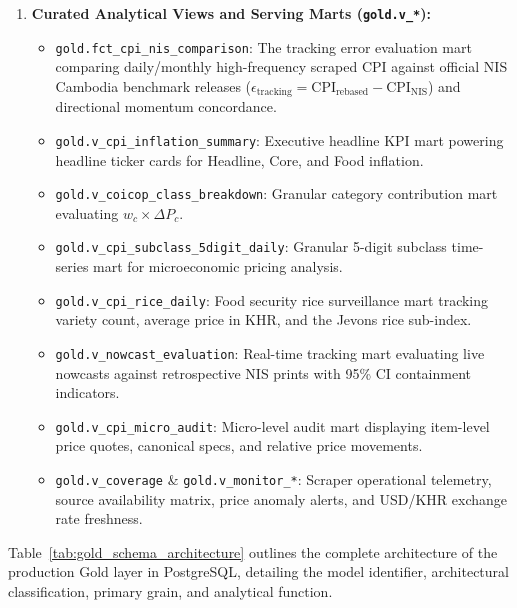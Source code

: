 \begin{enumerate}
    \item \textbf{Curated Analytical Views and Serving Marts (\texttt{gold.v\_*}):}
    \begin{itemize}
        \item \texttt{gold.fct\_cpi\_nis\_comparison}: The tracking error evaluation mart comparing daily/monthly high-frequency scraped CPI against official NIS Cambodia benchmark releases ($\epsilon_{\text{tracking}} = \text{CPI}_{\text{rebased}} - \text{CPI}_{\text{NIS}}$) and directional momentum concordance.
        \item \texttt{gold.v\_cpi\_inflation\_summary}: Executive headline KPI mart powering headline ticker cards for Headline, Core, and Food inflation.
        \item \texttt{gold.v\_coicop\_class\_breakdown}: Granular category contribution mart evaluating $w_c \times \Delta P_c$.
        \item \texttt{gold.v\_cpi\_subclass\_5digit\_daily}: Granular 5-digit subclass time-series mart for microeconomic pricing analysis.
        \item \texttt{gold.v\_cpi\_rice\_daily}: Food security rice surveillance mart tracking variety count, average price in KHR, and the Jevons rice sub-index.
        \item \texttt{gold.v\_nowcast\_evaluation}: Real-time tracking mart evaluating live nowcasts against retrospective NIS prints with 95\% CI containment indicators.
        \item \texttt{gold.v\_cpi\_micro\_audit}: Micro-level audit mart displaying item-level price quotes, canonical specs, and relative price movements.
        \item \texttt{gold.v\_coverage} \& \texttt{gold.v\_monitor\_*}: Scraper operational telemetry, source availability matrix, price anomaly alerts, and USD/KHR exchange rate freshness.
    \end{itemize}
\end{enumerate}

\hs Table~\ref{tab:gold_schema_architecture} outlines the complete architecture of the production Gold layer in PostgreSQL, detailing the model identifier, architectural classification, primary grain, and analytical function.


